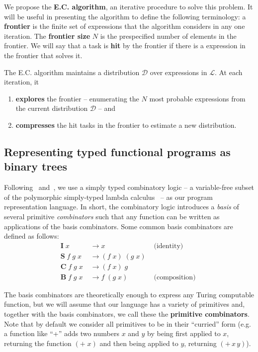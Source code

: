 \documentclass{article}
\begin{document}
We propose the \textbf{E.C. algorithm}, an iterative procedure to solve this
problem. It will be useful in presenting the algorithm to define the
following terminology: a \textbf{frontier} is the finite set of
expressions that the algorithm considers in any one iteration. The
\textbf{frontier size} $N$ is the prespecified number of elements in
the frontier. We will say that a task is \textbf{hit} by the frontier
if there is a expression in the frontier that solves it.

The E.C. algorithm maintains a distribution $\mathcal{D}$ over
expressions in $\mathcal{L}$. At each iteration, it
\begin{enumerate}
\item \textbf{explores} the frontier -- enumerating the $N$ most probable expressions
  from the current distribution $\mathcal{D}$ -- and
\item \textbf{compresses} the hit tasks in the frontier to estimate a new
  distribution.
\end{enumerate}

\subsection{Representing typed functional programs as binary trees}

Following~\cite{liang10programs} and~\cite{briggs2006functional}, we use a
simply typed combinatory logic -- a variable-free subset of the
polymorphic simply-typed lambda calculus~\cite{Pierce_2002} -- as our
program representation language. In short, the combinatory logic
introduces a \emph{basis} of several primitive \emph{combinators} such
that any function can be written as applications of the basis
combinators. Some common basis combinators are defined as follows:
\begin{align}
\mathbf{I}\; x &\rightarrow  x & \text{ (identity) }\\
\mathbf{S}\; f\; g\; x\; &\rightarrow (f\; x)\; (g\; x)\\ 
\mathbf{C}\; f\; g\; x\; &\rightarrow (f\; x)\; g  \\ 
\mathbf{B}\; f\; g\; x\; &\rightarrow f\; (g\; x) & \text{ (composition) }
\end{align}

The basis combinators are theoretically enough to express any Turing
computable function, but we will assume that our language has a
variety of primitives and, together with the basis combinators, we
call these the \textbf{primitive combinators}. Note that by default we consider
all primitives to be in their ``curried'' form (e.g. a function like
``+'' adds two numbers $x$ and $y$ by being first applied to $x$,
returning the function $(+\;x)$ and then being applied to $y$,
returning $(+\,x\,y)$\;).
\end{document}
